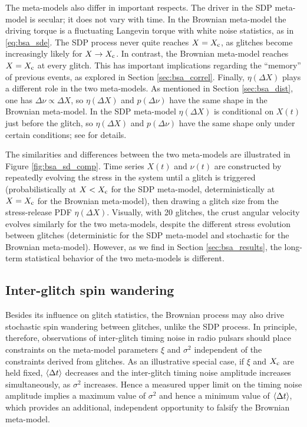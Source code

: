 The meta-models also differ in important respects. The driver in the SDP meta-model is secular; it does not vary with time. In the Brownian meta-model the driving torque is a fluctuating Langevin torque with white noise statistics, as in \eqref{eq:bsa_sde}. The SDP process never quite reaches $X = X_\textrm{c}$, as glitches become increasingly likely for $X \rightarrow X_\textrm{c}$. In contrast, the Brownian meta-model reaches $X=X_\textrm{c}$ at every glitch. This has important implications regarding the ``memory'' of previous events, as explored in Section \ref{sec:bsa_correl}. Finally, $\eta(\Delta X)$ plays a different role in the two meta-models. As mentioned in Section \ref{sec:bsa_dist}, one has $\Delta \nu \propto \Delta X$, so $\eta(\Delta X)$ and $p(\Delta \nu)$ have the same shape in the Brownian meta-model. In the SDP meta-model $\eta(\Delta X)$ is conditional on $X(t)$ just before the glitch, so $\eta(\Delta X)$ and $p(\Delta \nu)$ have the same shape only under certain conditions; see \citet{Carlin2019quasi} for details.

The similarities and differences between the two meta-models are illustrated in Figure \ref{fig:bsa_sd_comp}. Time series $X(t)$ and $\nu(t)$ are constructed by repeatedly evolving the stress in the system until a glitch is triggered (probabilistically at $X < X_\textrm{c}$ for the SDP meta-model, deterministically at $X=X_\textrm{c}$ for the Brownian meta-model), then drawing a glitch size from the stress-release PDF $\eta(\Delta X)$. Visually, with 20 glitches, the crust angular velocity evolves similarly for the two meta-models, despite the different stress evolution between glitches (deterministic for the SDP meta-model and stochastic for the Brownian meta-model). However, as we find in Section \ref{sec:bsa_results}, the long-term statistical behavior of the two meta-models is different.

\subsection{Inter-glitch spin wandering}
\label{sec:bsa_spinwand}
Besides its influence on glitch statistics, the Brownian process may also drive stochastic spin wandering between glitches, unlike the SDP process. In principle, therefore, observations of inter-glitch timing noise in radio pulsars \citep{Cordes1980, Price2012, Parthasarathy2019, Lower2020} should place constraints on the meta-model parameters $\xi$ and $\sigma^2$ independent of the constraints derived from glitches. As an illustrative special case, if $\xi$ and $X_\textrm{c}$ are held fixed, $\langle \Delta t \rangle$ decreases and the inter-glitch timing noise amplitude increases simultaneously, as $\sigma^2$ increases. Hence a measured upper limit on the timing noise amplitude implies a maximum value of $\sigma^2$ and hence a minimum value of $\langle \Delta t \rangle$, which provides an additional, independent opportunity to falsify the Brownian meta-model.

